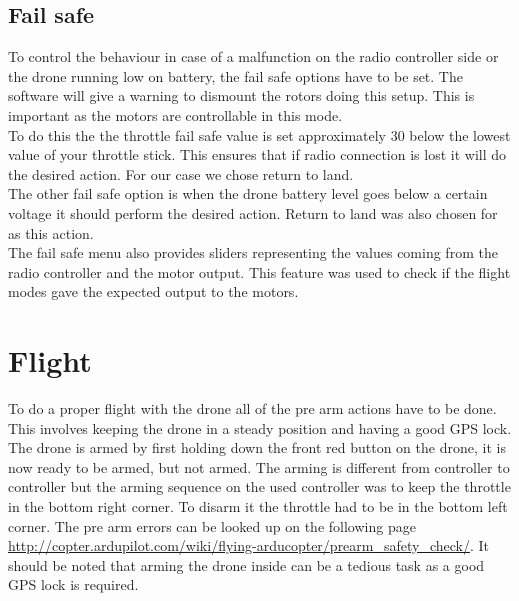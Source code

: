 \subsection*{Fail safe}
To control the behaviour in case of a malfunction on the radio controller side or the drone running low on battery, the fail safe options have to be set. The software will give a warning to dismount the rotors doing this setup. This is important as the motors are controllable in this mode.\\
To do this the the throttle fail safe value is set approximately 30 below the lowest value of your throttle stick. This ensures that if radio connection is lost it will do the desired action. For our case we chose return to land.\\
The other fail safe option is when the drone battery level goes below a certain voltage it should perform the desired action. Return to land was also chosen for as this action.\\
The fail safe menu also provides sliders representing the values coming from the radio controller and the motor output. This feature was used to check if the flight modes gave the expected output to the motors.

\section{Flight}
To do a proper flight with the drone all of the pre arm actions have to be done. This involves keeping the drone in a steady position and having a good GPS lock. The drone is armed by first holding down the front red button on the drone, it is now ready to be armed, but not armed. The arming is different from controller to controller but the arming sequence on the used controller was to keep the throttle in the bottom right corner. To disarm it the throttle had to be in the bottom left corner. The pre arm errors can be looked up on the following page \url{http://copter.ardupilot.com/wiki/flying-arducopter/prearm_safety_check/}. It should be noted that arming the drone inside can be a tedious task as a good GPS lock is required.\\ 

